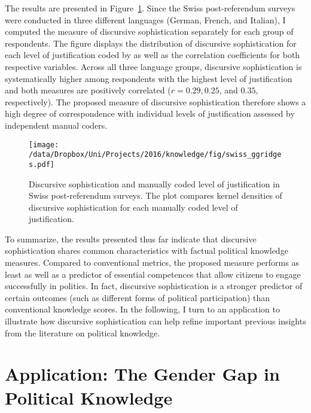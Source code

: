 The results are presented in Figure~\ref{fig:swiss_ggridges}. Since the Swiss post-referendum surveys were conducted in three different languages (German, French, and Italian), I computed the measure of discursive sophistication separately for each group of respondents. The figure displays the distribution of discursive sophistication for each level of justification coded by \citet{colombo2016justifications} as well as the correlation coefficients for both respective variables. Across all three language groups, discursive sophistication is systematically higher among respondents with the highest level of justification and both measures are positively correlated ($r=0.29, 0.25$, and $0.35$, respectively). The proposed measure of discursive sophistication therefore shows a high degree of correspondence with individual levels of justification assessed by independent manual coders.

\begin{figure}[h]\centering
\texttt{[image: /data/Dropbox/Uni/Projects/2016/knowledge/fig/swiss\_ggridges.pdf]}
\caption[Discursive sophistication and manually coded level of justification in Swiss post-referendum surveys]{Discursive sophistication and manually coded level of justification \citep{colombo2016justifications} in Swiss post-referendum surveys. The plot compares kernel densities of discursive sophistication for each manually coded level of justification.}\label{fig:swiss_ggridges}
\end{figure}

To summarize, the results presented thus far indicate that discursive sophistication shares common characteristics with factual political knowledge measures. Compared to conventional metrics, the proposed measure performs as least as well as a predictor of essential competences that allow citizens to engage successfully in politics. In fact, discursive sophistication is a stronger predictor of certain outcomes (such as different forms of political participation) than conventional knowledge scores. In the following, I turn to an application to illustrate how discursive sophistication can help refine important previous insights from the literature on political knowledge.

\section*{Application: The Gender Gap in Political Knowledge}

